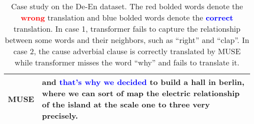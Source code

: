 \documentclass{article} \usepackage{iclr2020_conference,times}
\begin{document}
\begin{table*}[ht]
\begin{tabular}{p{2cm}p{10cm}}
\midrule
\textbf{MUSE} & and \textbf{\textcolor{blue}{that's why we decided}} to build a hall in berlin, where we can sort of map the electric relationship of the island at the scale one to three very precisely. \\
\bottomrule
\end{tabular}
\caption{Case study on the De-En dataset. The red bolded words denote the \textbf{\textcolor{red}{wrong}} translation and blue bolded words denote the \textbf{\textcolor{blue}{correct}} translation. In case 1, transformer fails to capture the relationship between some words and their neighbors, such as ``right'' and ``clap''. In case 2, the cause adverbial clause is correctly translated by MUSE while transformer misses the word ``why'' and fails to translate it. }
\label{tab:case_study}
\end{table*}
\end{document}
